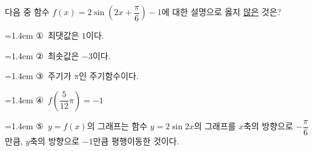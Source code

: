 다음 중 함수 $f(x)=2\sin\left(2x+\dfrac{\pi}{6}\right)-1$에 대한 설명으로 옳지 \underline{않은} 것은?
\par\medskip\par\noindent\hangindent=1.4em {\small ①}\ 최댓값은 $1$이다.\par\noindent\hangindent=1.4em {\small ②}\ 최솟값은 $-3$이다.\par\noindent\hangindent=1.4em {\small ③}\ 주기가 $\pi$인 주기함수이다.\par\noindent\hangindent=1.4em {\small ④}\ $f\left(\dfrac{5}{12}\pi\right)=-1$\par\noindent\hangindent=1.4em {\small ⑤}\ $y=f(x)$의 그래프는 함수 $y=2\sin 2x$의 그래프를 $x$축의 방향으로 $-\dfrac{\pi}{6}$만큼, $y$축의 방향으로 $-1$만큼 평행이동한 것이다.\par\medskip
